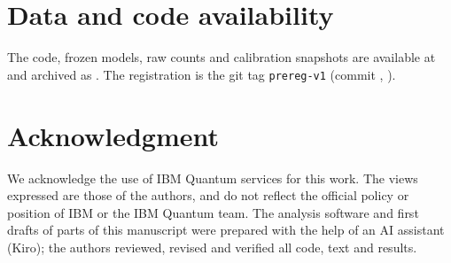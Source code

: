 \documentclass[10pt,conference]{IEEEtran}
\begin{document}








\section*{Data and code availability}
The code, frozen models, raw counts and calibration snapshots are available at
 and archived as . The registration is the git tag
\texttt{prereg-v1} (commit \texttt{}, ).

\section*{Acknowledgment}
We acknowledge the use of IBM Quantum services for this work. The views expressed are those of
the authors, and do not reflect the official policy or position of IBM or the IBM Quantum team.
The analysis software and first drafts of parts of this manuscript were prepared with the help
of an AI assistant (Kiro); the authors reviewed, revised and verified all code, text and results.



\end{document}
